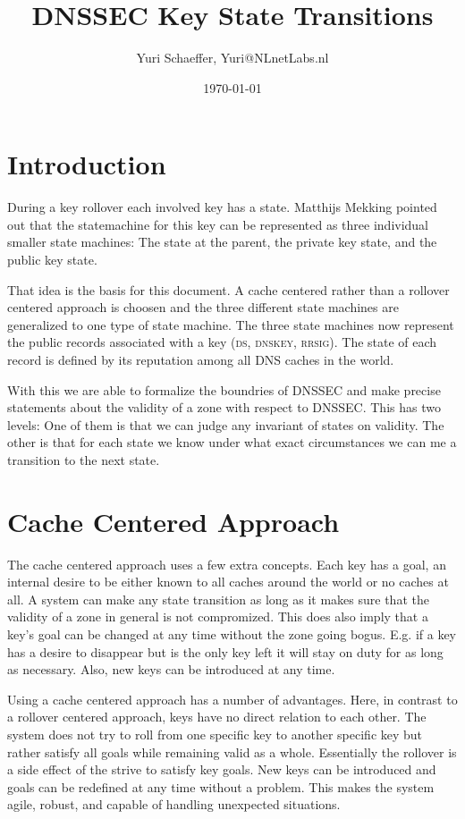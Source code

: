 \documentclass[twoside,english]{paper}
\title{DNSSEC Key State Transitions}
\author{Yuri Schaeffer, Yuri@NLnetLabs.nl}
\date{\today}
\begin{document}
\maketitle
\tableofcontents

\section{Introduction}

During a key rollover each involved key has a state. Matthijs 
Mekking pointed out that the statemachine for this key can be 
represented as three individual smaller state machines: The state at 
the parent, the private key state, and the public key state. 

That idea is the basis for this document. A cache centered rather 
than a rollover centered approach is choosen and the three different 
state machines are generalized to one type of state machine. The three
state machines now represent the public records associated with a key 
(\textsc{ds}, \textsc{dnskey}, \textsc{rrsig}). The state of each record is defined by its 
reputation among all DNS caches in the world. 

With this we are able to formalize the boundries of DNSSEC and make
precise statements about the validity of a zone with respect to DNSSEC.
This has two levels: One of them is that we can judge any invariant of
states on validity. The other is that for each state we know under
what exact circumstances we can me a transition to the next state.

\section{Cache Centered Approach}

The cache centered approach uses a few extra concepts. Each key has 
a goal, an internal desire to be either known to all caches around 
the world or no caches at all. A system can make any state 
transition as long as it makes sure that the validity of a zone in 
general is not compromized. This does also imply that a key's goal can
be changed at any time without the zone going bogus. E.g. if a key has
a desire to disappear but is the only key left it will stay on duty for
as long as necessary. Also, new keys can be introduced at any time.

Using a cache centered approach has a number of advantages. Here, in 
contrast to a rollover centered approach, keys have no direct 
relation to each other. The system does not try to roll from one 
specific key to another specific key but rather satisfy all goals 
while remaining valid as a whole. Essentially the rollover is a side 
effect of the strive to satisfy key goals. New keys can be 
introduced and goals can be redefined at any time without a problem. 
This makes the system agile, robust, and capable of handling unexpected
situations.
\end{document}
